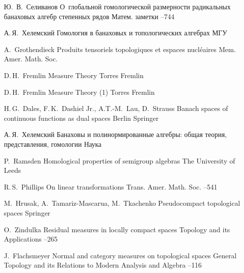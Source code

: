 \documentclass[12pt]{article}
\numberwithin{equation}{subsection}
\theoremstyle{plain}
\begin{document}
\begin{thebibliography}{99}
     \by Ю.~В.~Селиванов 
    \paper О~глобальной гомологической размерности радикальных банаховых алгебр 
    степенных рядов \jour Матем. заметки    
    --744

     \by А.\,Я.~Хелемский \book Гомология в
    банаховых и топологических алгебрах \publ МГУ 

     \by A.~Grothendieck \paper Produits
    tensoriels topologiques et espaces nucl{\'e}aires \jour Mem. Amer. Math.
    Soc.  

     \by D.\,H.~Fremlin \book Measure Theory  \publ
    Torres Fremlin 

     \by D.\,H.~Fremlin \book Measure Theory (1)
    \publ Torres Fremlin 

     \by H.\,G.~Dales, F.\,K.~Dashiel Jr.,
    A.T.-M.~Lau, D.~Strauss \book Banach spaces of continuous functions as dual
    spaces \publaddr Berlin \publ Springer 

     \by А.\,Я.~Хелемский \book Банаховы и 
    полинормированные алгебры: общая теория, представления, гомологии 
    \publ Наука 

     \by P.~Ramsden \book Homological
    properties of semigroup algebras \publaddr The University of Leeds 

     \by R.\,S.~Phillips \paper On linear
    transformations \jour Trans. Amer. Math. Soc.   --541

     \by M.~Hrusak, A.~Tamariz-Mascarua,
    M.~Tkachenko \book Pseudocompact topological spaces \publ Springer 

     \by O.~Zindulka \paper Residual measures in
    locally compact spaces \jour Topology and its Applications    --265

    \by J.~Flachsmeyer \paper Normal and category measures on topological spaces
    \jour General Topology and its Relations to Modern Analysis and Algebra  --116

\end{thebibliography}
\end{document}

